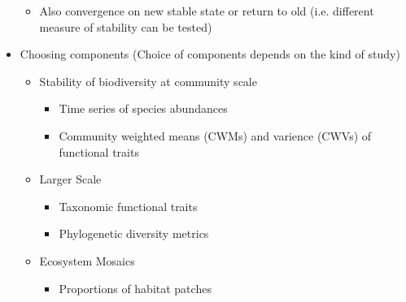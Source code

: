 \begin{itemize}
\begin{itemize}
	\item Also convergence on new stable state or return to old (i.e. different measure of stability can be tested)
	\end{itemize} 
	\item Choosing components (Choice of components depends on the kind of study)
	\begin{itemize}
		\item Stability of biodiversity at community scale
		\begin{itemize}
			\item Time series of species abundances
			\item Community weighted means (CWMs) and varience (CWVs) of functional traits
		\end{itemize}
		\item Larger Scale
		\begin{itemize}
			\item Taxonomic functional traits
			\item Phylogenetic diversity metrics
		\end{itemize}
		\item Ecosystem Mosaics
		\begin{itemize}
			\item Proportions of habitat patches
		\end{itemize}
	\end{itemize}
\end{itemize}

